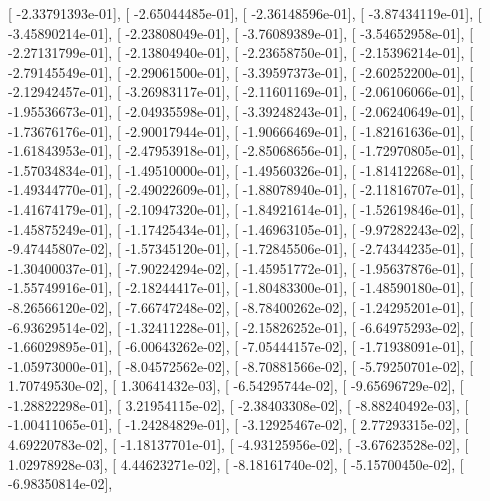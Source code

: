 \documentclass{article}
\begin{document}
       [ -2.33791393e-01],
       [ -2.65044485e-01],
       [ -2.36148596e-01],
       [ -3.87434119e-01],
       [ -3.45890214e-01],
       [ -2.23808049e-01],
       [ -3.76089389e-01],
       [ -3.54652958e-01],
       [ -2.27131799e-01],
       [ -2.13804940e-01],
       [ -2.23658750e-01],
       [ -2.15396214e-01],
       [ -2.79145549e-01],
       [ -2.29061500e-01],
       [ -3.39597373e-01],
       [ -2.60252200e-01],
       [ -2.12942457e-01],
       [ -3.26983117e-01],
       [ -2.11601169e-01],
       [ -2.06106066e-01],
       [ -1.95536673e-01],
       [ -2.04935598e-01],
       [ -3.39248243e-01],
       [ -2.06240649e-01],
       [ -1.73676176e-01],
       [ -2.90017944e-01],
       [ -1.90666469e-01],
       [ -1.82161636e-01],
       [ -1.61843953e-01],
       [ -2.47953918e-01],
       [ -2.85068656e-01],
       [ -1.72970805e-01],
       [ -1.57034834e-01],
       [ -1.49510000e-01],
       [ -1.49560326e-01],
       [ -1.81412268e-01],
       [ -1.49344770e-01],
       [ -2.49022609e-01],
       [ -1.88078940e-01],
       [ -2.11816707e-01],
       [ -1.41674179e-01],
       [ -2.10947320e-01],
       [ -1.84921614e-01],
       [ -1.52619846e-01],
       [ -1.45875249e-01],
       [ -1.17425434e-01],
       [ -1.46963105e-01],
       [ -9.97282243e-02],
       [ -9.47445807e-02],
       [ -1.57345120e-01],
       [ -1.72845506e-01],
       [ -2.74344235e-01],
       [ -1.30400037e-01],
       [ -7.90224294e-02],
       [ -1.45951772e-01],
       [ -1.95637876e-01],
       [ -1.55749916e-01],
       [ -2.18244417e-01],
       [ -1.80483300e-01],
       [ -1.48590180e-01],
       [ -8.26566120e-02],
       [ -7.66747248e-02],
       [ -8.78400262e-02],
       [ -1.24295201e-01],
       [ -6.93629514e-02],
       [ -1.32411228e-01],
       [ -2.15826252e-01],
       [ -6.64975293e-02],
       [ -1.66029895e-01],
       [ -6.00643262e-02],
       [ -7.05444157e-02],
       [ -1.71938091e-01],
       [ -1.05973000e-01],
       [ -8.04572562e-02],
       [ -8.70881566e-02],
       [ -5.79250701e-02],
       [  1.70749530e-02],
       [  1.30641432e-03],
       [ -6.54295744e-02],
       [ -9.65696729e-02],
       [ -1.28822298e-01],
       [  3.21954115e-02],
       [ -2.38403308e-02],
       [ -8.88240492e-03],
       [ -1.00411065e-01],
       [ -1.24284829e-01],
       [ -3.12925467e-02],
       [  2.77293315e-02],
       [  4.69220783e-02],
       [ -1.18137701e-01],
       [ -4.93125956e-02],
       [ -3.67623528e-02],
       [  1.02978928e-03],
       [  4.44623271e-02],
       [ -8.18161740e-02],
       [ -5.15700450e-02],
       [ -6.98350814e-02],
\end{document}
